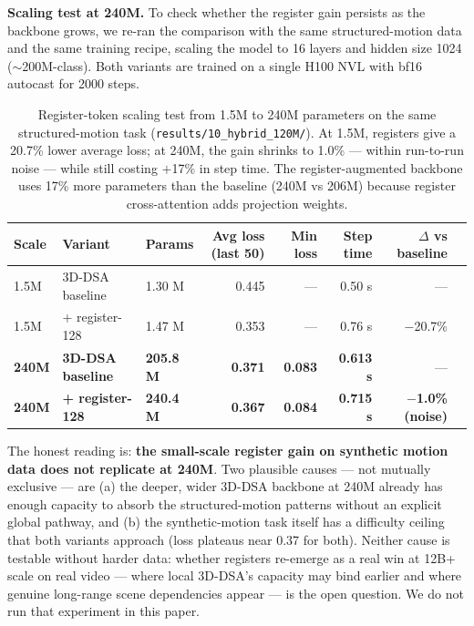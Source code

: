 \documentclass[11pt, letterpaper]{article}
\begin{document}
\textbf{Scaling test at 240M.} To check whether the register gain persists as the backbone grows, we re-ran the comparison with the same structured-motion data and the same training recipe, scaling the model to 16 layers and hidden size 1024 ($\sim$200M-class). Both variants are trained on a single H100 NVL with bf16 autocast for 2000 steps.

\begin{table}[h]
\centering
\small
\begin{tabular}{lllrrrrr}
\toprule
\textbf{Scale} & \textbf{Variant} & \textbf{Params} & \textbf{Avg loss (last 50)} & \textbf{Min loss} & \textbf{Step time} & \textbf{$\Delta$ vs baseline} \\
\midrule
1.5M  & 3D-DSA baseline  & 1.30 M   & 0.445 & ---   & 0.50 s   & --- \\
1.5M  & + register-128   & 1.47 M   & 0.353 & ---   & 0.76 s   & $-$20.7\% \\
\textbf{240M} & \textbf{3D-DSA baseline} & \textbf{205.8 M} & \textbf{0.371} & \textbf{0.083} & \textbf{0.613 s} & --- \\
\textbf{240M} & \textbf{+ register-128}  & \textbf{240.4 M} & \textbf{0.367} & \textbf{0.084} & \textbf{0.715 s} & \textbf{$-$1.0\% (noise)} \\
\bottomrule
\end{tabular}
\caption{Register-token scaling test from 1.5M to 240M parameters on the same structured-motion task (\texttt{results/10\_hybrid\_120M/}). At 1.5M, registers give a 20.7\% lower average loss; at 240M, the gain shrinks to 1.0\% --- within run-to-run noise --- while still costing $+$17\% in step time. The register-augmented backbone uses 17\% more parameters than the baseline (240M vs 206M) because register cross-attention adds projection weights.}
\label{tab:hybrid_scaling}
\end{table}

The honest reading is: \textbf{the small-scale register gain on synthetic motion data does not replicate at 240M}. Two plausible causes --- not mutually exclusive --- are (a) the deeper, wider 3D-DSA backbone at 240M already has enough capacity to absorb the structured-motion patterns without an explicit global pathway, and (b) the synthetic-motion task itself has a difficulty ceiling that both variants approach (loss plateaus near 0.37 for both). Neither cause is testable without harder data: whether registers re-emerge as a real win at 12B+ scale on real video --- where local 3D-DSA's capacity may bind earlier and where genuine long-range scene dependencies appear --- is the open question. We do not run that experiment in this paper.
\end{document}
